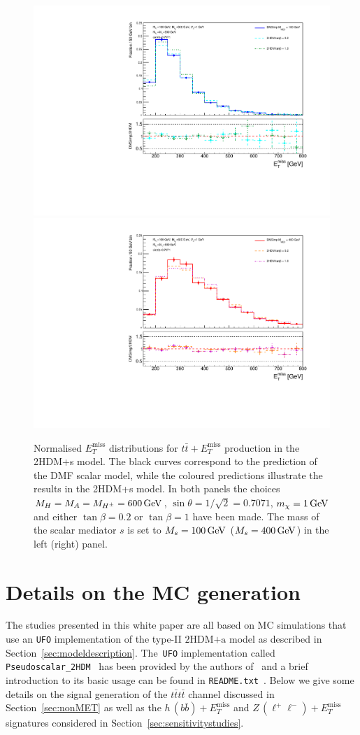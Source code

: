 \documentclass[a4paper, 11pt,notoc]{article}
\newcommand{\MET}{\ensuremath{E_T^\mathrm{miss}}\xspace}
\newcommand{\hdma}{\ensuremath{\textrm{2HDM+a}}\xspace}
\begin{document}
\begin{figure}
\centering
\includegraphics[width=.475\textwidth]{Met100GeV.pdf} \quad 
\includegraphics[width=.475\textwidth]{Met400GeV.pdf}
\vspace{2mm}
\caption{ Normalised $\MET$ distributions for $t \bar t + \MET$ production in the 2HDM+s model. The black curves correspond to the prediction of the DMF scalar   model, while the coloured predictions illustrate the results in the 2HDM+s  model. In both panels the choices $M_H = M_A = M_{H^\pm} = 600 \, {\rm GeV}$, $\sin\theta=1/\sqrt{2}=0.7071$, $m_\chi = 1 \, {\rm GeV}$ and either $\tan \beta = 0.2$ or $\tan \beta = 1$ have been made. The mass of the scalar mediator $s$ is set to $M_s = 100 \, {\rm GeV}$ ($M_s = 400 \, {\rm GeV}$) in the left (right) panel.}
\label{fig:ttMETscalar}
\end{figure}


\section{Details on the MC generation}
\label{app:mcgeneration}

The studies presented in this white paper are all based on MC simulations that use an {\tt UFO} implementation of the type-II \hdma model as described in Section~\ref{sec:modeldescription}. The~{\tt UFO} implementation  called {\tt Pseudoscalar\_2HDM}~\cite{hdmaUFO} has been provided by the authors of~\cite{Bauer:2017ota} and a brief introduction to its basic usage can be found in {\tt README.txt}~\cite{hdmaREADME}. Below we give some details on   the signal generation of the $t \bar t t \bar t$ channel discussed in Section~\ref{sec:nonMET} as well as  the $h \, (b \bar b) + \MET$ and $Z \, (\ell^+ \ell^-)+ \MET$ signatures  considered in Section~\ref{sec:sensitivitystudies}.
\end{document}

